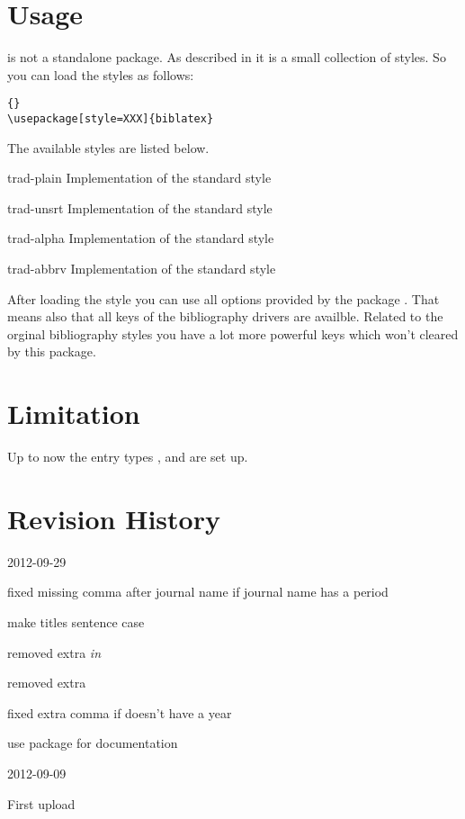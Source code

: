 \documentclass{ltxdockit}[2011/03/25]
\begin{document}
\section{Usage}

 is not a standalone package. As described in  it is
a small collection of styles. So you can load the styles as follows:

\begin{lstlisting}[style=latex]{}
\usepackage[style=XXX]{biblatex}
\end{lstlisting}
The available styles are listed below.
\begin{marglist}

\item[trad-plain] Implementation of the standard style 
\item[trad-unsrt] Implementation of the standard style 
\item[trad-alpha] \BiberOnlyMark Implementation of the standard style 
\item[trad-abbrv] Implementation of the standard style 

\end{marglist}

After loading the style you can use all options provided by the package .
That means also that all keys of the bibliography drivers are availble.
Related to the orginal bibliography styles you have a lot more powerful keys which won't cleared by this package.

\section{Limitation}

Up to now the entry types ,  and  are set up.

\section{Revision History}
\label{apx:log}


\begin{changelog}

\begin{release}{0.2}{2012-09-29}
\item fixed missing comma after journal name if journal name has a period
\item make titles sentence case
\item removed extra \emph{in}
\item removed extra 
\item fixed extra comma if  doesn't have a year
\item use package  for documentation
\end{release}

\begin{release}{0.1}{2012-09-09}
\item First upload
\end{release}

\end{changelog}
\end{document}
